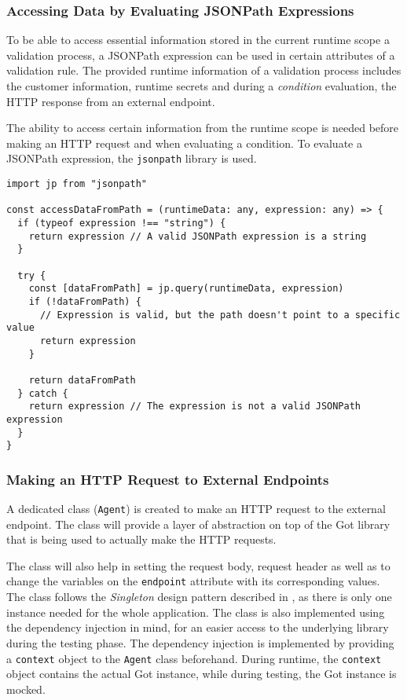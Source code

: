     \subsubsection{Accessing Data by Evaluating JSONPath Expressions}
      
      To be able to access essential information stored in the current runtime scope a validation process, a JSONPath expression can be used in certain attributes of a validation rule. The provided runtime information of a validation process includes the customer information, runtime secrets and during a \emph{condition} evaluation, the HTTP response from an external endpoint. 

      The ability to access certain information from the runtime scope is needed before making an HTTP request and when evaluating a condition. To evaluate a JSONPath expression, the \verb;jsonpath; library is used. 

      \begin{lstlisting}[style=es6, caption={Accessing runtime information using JSONPath expression (TypeScript)}]
import jp from "jsonpath"

const accessDataFromPath = (runtimeData: any, expression: any) => {
  if (typeof expression !== "string") {
    return expression // A valid JSONPath expression is a string
  }
  
  try {
    const [dataFromPath] = jp.query(runtimeData, expression)
    if (!dataFromPath) {
      // Expression is valid, but the path doesn't point to a specific value
      return expression 
    }

    return dataFromPath
  } catch {
    return expression // The expression is not a valid JSONPath expression
  }
}
      \end{lstlisting}

    \subsubsection{Making an HTTP Request to External Endpoints}

      A dedicated class (\verb;Agent;) is created to make an HTTP request to the external endpoint. The class will provide a layer of abstraction on top of the Got library that is being used to actually make the HTTP requests. 
      
      The class will also help in setting the request body, request header as well as to change the variables on the \verb;endpoint; attribute with its corresponding values. The class follows the \emph{Singleton} design pattern described in \autocite[pp. 127-134]{gamma-1995}, as there is only one instance needed for the whole application. The class is also implemented using the dependency injection in mind, for an easier access to the underlying library during the testing phase. The dependency injection is implemented by providing a \verb;context; object to the \verb;Agent; class beforehand. During runtime, the \verb;context; object contains the actual Got instance, while during testing, the Got instance is mocked.

